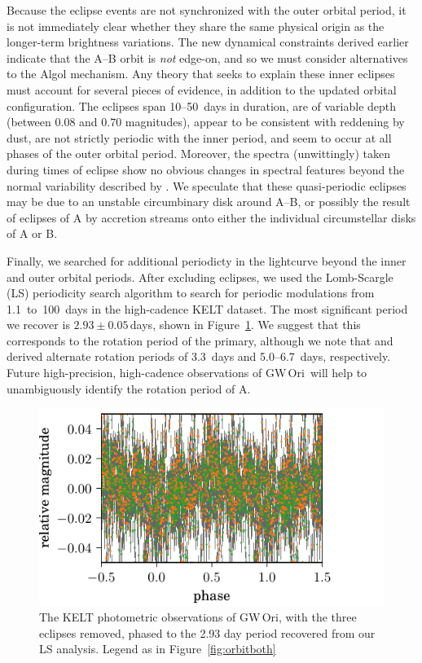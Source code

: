 \documentclass[twocolumn]{aastex61}
\newcommand{\obj}{GW\,Ori}
\begin{document}
Because the eclipse events are not synchronized with the outer orbital period, it is not immediately clear whether they share the same physical origin as the longer-term brightness variations. The new dynamical constraints derived earlier indicate that the A--B orbit is {\it not} edge-on, and so we must consider alternatives to the Algol mechanism. Any theory that seeks to explain these inner eclipses must account for several pieces of evidence, in addition to the updated orbital configuration. The eclipses span \mbox{10--50 days} in duration, are of variable depth (between 0.08 and 0.70 magnitudes), appear to be consistent with reddening by dust, are not strictly periodic with the inner period, and seem to occur at all phases of the outer orbital period. Moreover, the spectra (unwittingly) taken during times of eclipse show no obvious changes in spectral features beyond the normal variability described by \citet{fang14}. We speculate that these quasi-periodic eclipses may be due to an unstable circumbinary disk around A--B, or possibly the result of eclipses of A by accretion streams onto either the individual circumstellar disks of A or B.

Finally, we searched for additional periodicty in the lightcurve beyond the inner and outer orbital periods. After excluding eclipses, we used the Lomb-Scargle (LS) periodicity search algorithm \citep{lomb76,scargle82}  \citep[within the VARTOOLS analysis package;][]{hartman16} to search for periodic modulations from \mbox{1.1 to 100 days} in the high-cadence KELT dataset. The most significant period we recover is \mbox{$2.93 \pm 0.05$\,days}, shown in Figure~\ref{fig:phased}. We suggest that this corresponds to the rotation period of the primary, although we note that \citet{bouvier90} and \citet{fang14} derived alternate rotation periods of \mbox{3.3 days} and \mbox{5.0--6.7 days}, respectively. Future high-precision, high-cadence observations of \obj\ will help to unambiguously identify the rotation period of A.

\begin{figure}[!ht]
\includegraphics{rotation-phased.pdf}
\caption{The KELT photometric observations of \obj, with the three eclipses removed, phased to the 2.93 day period recovered from our LS analysis. Legend as in Figure~\ref{fig:orbitboth}}
\label{fig:phased}
\end{figure}
\end{document}
